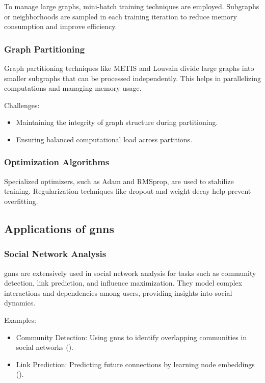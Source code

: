 To manage large graphs, mini-batch training techniques are employed. Subgraphs or neighborhoods are sampled in each training iteration to reduce memory consumption and improve efficiency.

\subsubsection*{Graph Partitioning}

Graph partitioning techniques like METIS and Louvain divide large graphs into smaller subgraphs that can be processed independently. This helps in parallelizing computations and managing memory usage.

Challenges:
\begin{itemize}
    \item Maintaining the integrity of graph structure during partitioning.
    \item Ensuring balanced computational load across partitions.
\end{itemize}

\subsubsection*{Optimization Algorithms}

Specialized optimizers, such as Adam and RMSprop, are used to stabilize training. Regularization techniques like dropout and weight decay help prevent overfitting.

\subsection*{Applications of \glspl{gnn}}

\subsubsection*{Social Network Analysis}

\glspl{gnn} are extensively used in social network analysis for tasks such as community detection, link prediction, and influence maximization. They model complex interactions and dependencies among users, providing insights into social dynamics.

Examples:
\begin{itemize}
    \item Community Detection: Using \glspl{gnn} to identify overlapping communities in social networks (\cite{Chen2017}).
    \item Link Prediction: Predicting future connections by learning node embeddings (\cite{Zeng2019}).
\end{itemize}


